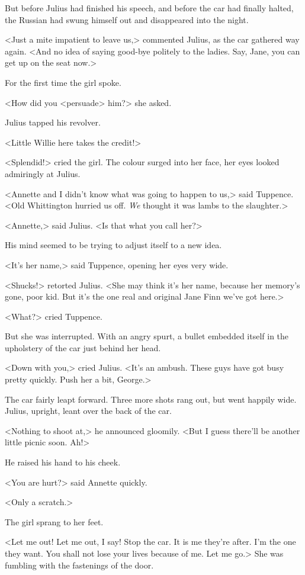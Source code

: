 But before Julius had finished his speech, and before the car had finally halted, the Russian had swung himself out and disappeared into the night.

<Just a mite impatient to leave us,> commented Julius, as the car gathered way again. <And no idea of saying good-bye politely to the ladies. Say, Jane, you can get up on the seat now.>

For the first time the girl spoke.

<How did you <persuade> him?> she asked.

Julius tapped his revolver.

<Little Willie here takes the credit!>

<Splendid!> cried the girl. The colour surged into her face, her eyes looked admiringly at Julius.

<Annette and I didn't know what was going to happen to us,> said Tuppence. <Old Whittington hurried us off. \emph{We} thought it was lambs to the slaughter.>

<Annette,> said Julius. <Is that what you call her?>

His mind seemed to be trying to adjust itself to a new idea.

<It's her name,> said Tuppence, opening her eyes very wide.

<Shucks!> retorted Julius. <She may think it's her name, because her memory's gone, poor kid. But it's the one real and original Jane Finn we've got here.>

<What?> cried Tuppence.

But she was interrupted. With an angry spurt, a bullet embedded itself in the upholstery of the car just behind her head.

<Down with you,> cried Julius. <It's an ambush. These guys have got busy pretty quickly. Push her a bit, George.>

The car fairly leapt forward. Three more shots rang out, but went happily wide. Julius, upright, leant over the back of the car.

<Nothing to shoot at,> he announced gloomily. <But I guess there'll be another little picnic soon. Ah!>

He raised his hand to his cheek.

<You are hurt?> said Annette quickly.

<Only a scratch.>

The girl sprang to her feet.

<Let me out! Let me out, I say! Stop the car. It is me they're after. I'm the one they want. You shall not lose your lives because of me. Let me go.> She was fumbling with the fastenings of the door.

